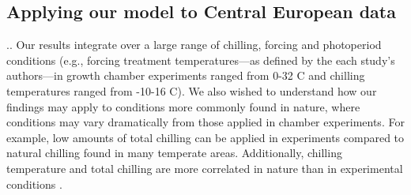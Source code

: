 \documentclass{article}
\begin{document}


\subsection*{Applying our model to Central European data}
.. 
Our results integrate over a large range of chilling, forcing and photoperiod conditions (e.g., forcing treatment temperatures---as defined by the each study's authors---in growth chamber experiments ranged from 0-32 \degree C and chilling temperatures ranged from -10-16 \degree C). We also wished to understand how our findings may apply to conditions more commonly found in nature, where conditions may vary dramatically from those applied in chamber experiments. For example, low amounts of total chilling can be applied in experiments compared to natural chilling found in many temperate areas. Additionally, chilling temperature and total chilling are more correlated in nature than in experimental conditions \citep{fig:chillexpfield}. 
\end{document}
